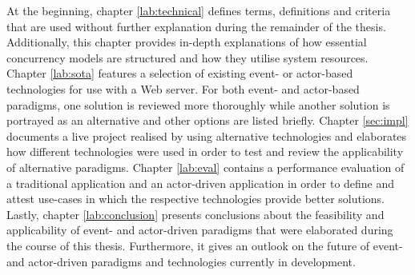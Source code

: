 At the beginning, chapter \ref{lab:technical} defines terms, definitions and criteria that are used without further explanation during the remainder of the thesis. Additionally, this chapter provides in-depth explanations of how essential concurrency models are structured and how they utilise system resources. Chapter \ref{lab:sota} features a selection of existing event- or actor-based technologies for use with a Web server. For both event- and actor-based paradigms, one solution is reviewed more thoroughly while another solution is portrayed as an alternative and other options are listed briefly. Chapter \ref{sec:impl} documents a live project realised by using alternative technologies and elaborates how different technologies were used in order to test and review the applicability of alternative paradigms. Chapter \ref{lab:eval} contains a performance evaluation of a traditional application and an actor-driven application in order to define and attest use-cases in which the respective technologies provide better solutions. Lastly, chapter \ref{lab:conclusion} presents conclusions about the feasibility and applicability of event- and actor-driven paradigms that were elaborated during the course of this thesis. Furthermore, it gives an outlook on the future of event- and actor-driven paradigms and technologies currently in development.






